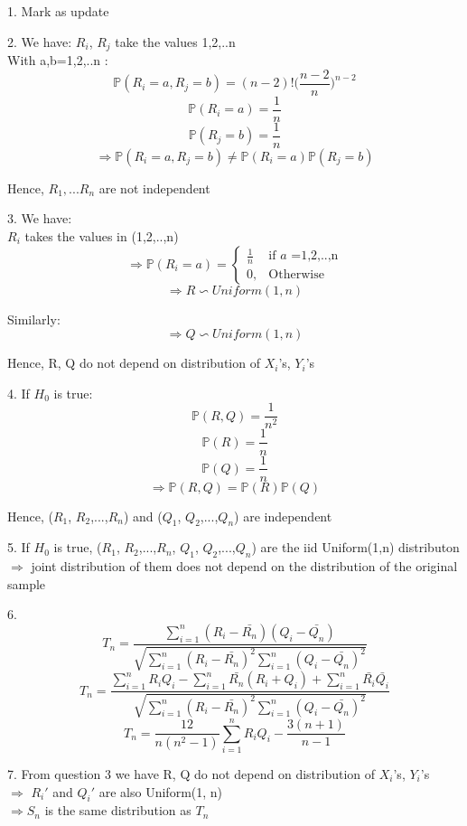\documentclass[10pt]{article}
\newenvironment{problem}[2][Problem]{\begin{trivlist}
\item[\hskip \labelsep {\bfseries #1}\hskip \labelsep {\bfseries #2.}]}{\end{trivlist}}
\begin{document}
\begin{problem}{3}
\item 1.
Mark as update
\item 2.
We have: $R_i$, $R_j$ take the values 1,2,..n\\

With a,b=1,2,..n :
\[\mathbb{P}(R_i=a, R_j=b)= (n-2)!\big(\frac{n-2}{n} \big)^{n-2} \] 
\[\mathbb{P}(R_i=a)= \frac{1}{n}\]
\[\mathbb{P}(R_j=b)= \frac{1}{n}\]
\[\Rightarrow \mathbb{P}(R_i=a, R_j=b)\neq \mathbb{P}(R_i=a)\mathbb{P}(R_j=b)  \]

Hence, $R_1,...R_{n}$ are not independent


\item 3.
We have: \\

$R_i$ takes the values in (1,2,..,n)
\[\Rightarrow \mathbb{P}(R_i=a)=\begin{cases} \frac{1}{n} & \mbox{if } a\mbox{ =1,2,..,n} \\ 0, &  \mbox{Otherwise } \end{cases}\]
\[\Rightarrow R  \backsim Uniform(1, n)\]

Similarly:
\[\Rightarrow Q  \backsim Uniform(1, n)\]

Hence, R, Q do not depend on  distribution of $X_i$'s, $Y_i$'s

\item 4.
If $H_0$ is true:
\[\mathbb{P}(R, Q)=\frac{1}{n^2}\]
\[\mathbb{P}(R)=\frac{1}{n}\]
\[\mathbb{P}(Q)=\frac{1}{n}\]
\[\Rightarrow \mathbb{P}(R, Q)=\mathbb{P}(R)\mathbb{P}(Q)\]

Hence, ($R_1$, $R_2$,...,$R_n$) and ($Q_1$, $Q_2$,...,$Q_n$) are independent

\item 5.
If $H_0$ is true, ($R_1$, $R_2$,...,$R_n$, $Q_1$, $Q_2$,...,$Q_n$) are the iid Uniform(1,n) distributon $\Rightarrow$ joint distribution of them does not depend on the distribution of the
original sample

\item 6.
\[T_n=\frac{\sum_{i=1}^{n}(R_i-\bar{R_n})(Q_i-\bar{Q_n})}{\sqrt{\sum_{i=1}^{n}(R_i-\bar{R_n})^2\sum_{i=1}^{n}(Q_i-\bar{Q_n})^2}}\]
\[T_n=\frac{\sum_{i=1}^n R_iQ_i -\sum_{i=1}^n \bar{R_n}(R_i+Q_i)+\sum_{i=1}^n \bar{R_i}\bar{Q_i}}{\sqrt{\sum_{i=1}^{n}(R_i-\bar{R_n})^2\sum_{i=1}^{n}(Q_i-\bar{Q_n})^2}}\]
\[T_n=\frac{12}{n(n^2-1)}\sum_{i=1}^{n} R_iQ_i- \frac{3(n+1)}{n-1}\]

\item 7.
From question 3 we have R, Q do not depend on  distribution of $X_i$'s, $Y_i$'s\\

$\Rightarrow$ $R_i '$ and $Q_i '$ are also Uniform(1, n)\\

$\Rightarrow S_n$ is the same distribution as $T_n$




\end{problem}
\end{document}
